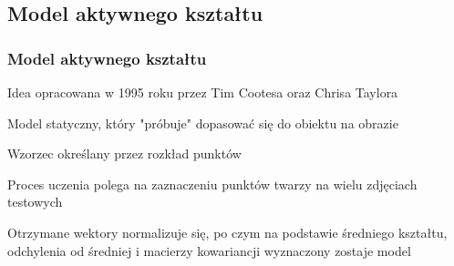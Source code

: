\documentclass[xcolor=table]{beamer}
\begin{document}
\subsection{Model aktywnego kształtu}
\begin{frame}
  \frametitle{Model aktywnego kształtu}
  \begin{itemize}
   {\item Idea opracowana w 1995 roku przez Tim Cootesa oraz Chrisa Taylora}
   {\item Model statyczny, który "próbuje" dopasować się do obiektu na obrazie}
   {\item Wzorzec określany przez rozkład punktów}
   {\item Proces uczenia polega na zaznaczeniu punktów twarzy na wielu zdjęciach testowych}
   {\item Otrzymane wektory normalizuje się, po czym na podstawie średniego kształtu, odchylenia od średniej i macierzy kowariancji wyznaczony zostaje model}
 \end{itemize}
\end{frame}
\end{document}
